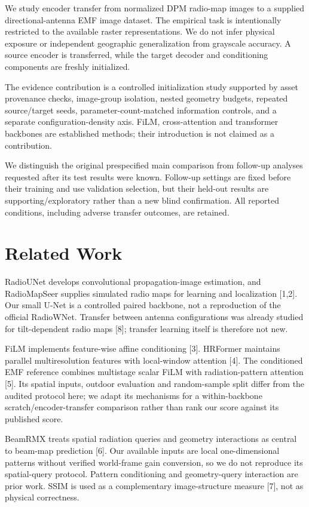 \documentclass[conference]{IEEEtran}
\begin{document}
We study encoder transfer from normalized DPM radio-map images to a supplied directional-antenna EMF image dataset. The empirical task is intentionally restricted to the available raster representations. We do not infer physical exposure or independent geographic generalization from grayscale accuracy. A source encoder is transferred, while the target decoder and conditioning components are freshly initialized.

The evidence contribution is a controlled initialization study supported by asset provenance checks, image-group isolation, nested geometry budgets, repeated source/target seeds, parameter-count-matched information controls, and a separate configuration-density axis. FiLM, cross-attention and transformer backbones are established methods; their introduction is not claimed as a contribution.

We distinguish the original prespecified main comparison from follow-up analyses requested after its test results were known. Follow-up settings are fixed before their training and use validation selection, but their held-out results are supporting/exploratory rather than a new blind confirmation. All reported conditions, including adverse transfer outcomes, are retained.

\section{Related Work}
RadioUNet develops convolutional propagation-image estimation, and RadioMapSeer supplies simulated radio maps for learning and localization [1,2]. Our small U-Net is a controlled paired backbone, not a reproduction of the official RadioWNet. Transfer between antenna configurations was already studied for tilt-dependent radio maps [8]; transfer learning itself is therefore not new.

FiLM implements feature-wise affine conditioning [3]. HRFormer maintains parallel multiresolution features with local-window attention [4]. The conditioned EMF reference combines multistage scalar FiLM with radiation-pattern attention [5]. Its spatial inputs, outdoor evaluation and random-sample split differ from the audited protocol here; we adapt its mechanisms for a within-backbone scratch/encoder-transfer comparison rather than rank our score against its published score.

BeamRMX treats spatial radiation queries and geometry interactions as central to beam-map prediction [6]. Our available inputs are local one-dimensional patterns without verified world-frame gain conversion, so we do not reproduce its spatial-query protocol. Pattern conditioning and geometry-query interaction are prior work. SSIM is used as a complementary image-structure measure [7], not as physical correctness.
\end{document}
